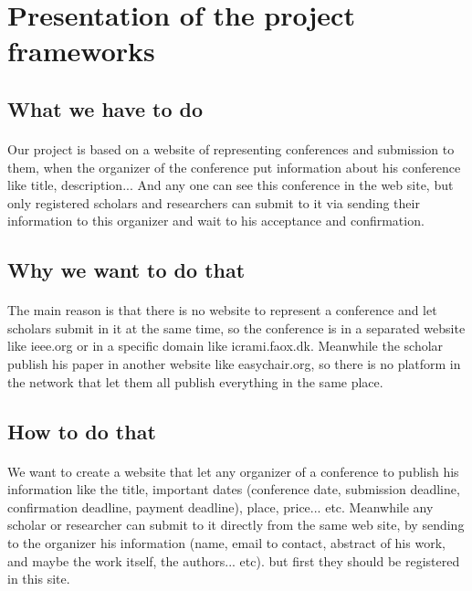 \section{Presentation of the project frameworks}
	\subsection{What we have to do}
		\paragraph{}
		Our project is based on a website of representing conferences and submission to them, when the organizer of the conference put information about his conference like title, description... And any one can see this conference in the web site, but only registered scholars and researchers can submit to it via sending their information to this organizer and wait to his acceptance and confirmation.
	\subsection{Why we want to do that}
		\paragraph{}
		The main reason is that there is no website to represent a conference and let scholars submit in it at the same time, so the conference is in a separated website like ieee.org or in a specific domain like icrami.faox.dk. Meanwhile the scholar publish his paper in another website like easychair.org, so there is no platform in the network that let them all publish everything in the same place.
	\subsection{How to do that}
		\paragraph{}
		We want to create a website that let any organizer of a conference to publish his information like the title, important dates (conference date, submission deadline, confirmation deadline, payment deadline), place, price... etc. Meanwhile any scholar or researcher can submit to it directly from the same web site, by sending to the organizer his information (name, email to contact, abstract of his work, and maybe the work itself, the authors... etc). but first they should be registered in this site.

